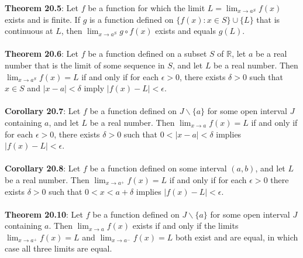 \documentclass{article}
\theoremstyle{definition}
\begin{document}
\textbf{Theorem 20.5}: Let $f$ be a function for which the limit $L = \lim_{x \rightarrow a^S} f(x)$ exists and is finite. If $g$ is a function defined on $\{f(x) : x \in S\} \cup \{L\}$ that is continuous at $L$, then $\lim_{x \rightarrow a^S} g \circ f(x)$ exists and equals $g(L)$. \\ \\
\textbf{Theorem 20.6}: Let $f$ be a function defined on a subset $S$ of $\mathbb{R}$, let $a$ be a real number that is the limit of some sequence in $S$, and let $L$ be a real number. Then $\lim_{x \rightarrow a^S} f(x) = L$ if and only if for each $\epsilon > 0$, there exists $\delta > 0$ such that $x \in S$ and $|x - a| < \delta$ imply $|f(x) - L| < \epsilon.$ \\ \\
\textbf{Corollary 20.7}: Let $f$ be a function defined on $J \backslash \{a\}$ for some open interval $J$ containing $a$, and let $L$ be a real number. Then $\lim_{x \rightarrow a} f(x) = L$ if and only if for each $\epsilon > 0$, there exists $\delta > 0$ such that $0 < |x - a| < \delta$ implies $|f(x) - L| < \epsilon$. \\ \\
\textbf{Corollary 20.8}: Let $f$ be a function defined on some interval $(a, b)$, and let $L$ be a real number. Then $\lim_{x \rightarrow a^+} f(x) = L$ if and only if for each $\epsilon > 0$ there exists $\delta > 0$ such that $0 < x < a + \delta$ implies $|f(x) - L| < \epsilon$. \\ \\
\textbf{Theorem 20.10}: Let $f$ be a function defined on $J \backslash \{a\}$ for some open interval $J$ containing $a$. Then $\lim_{x \rightarrow a} f(x)$ exists if and only if the limits $\lim_{x \rightarrow a^+} f(x) = L$ and $\lim_{x \rightarrow a^-} f(x) = L$ both exist and are equal, in which case all three limits are equal.
\end{document}
